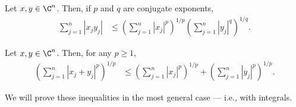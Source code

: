 \documentclass[10pt]{mypackage}
\begin{document}
\begin{theorem}
  Let $x,y\in \C^{n}$. Then, if $p$ and $q$ are conjugate exponents,
  \begin{align*}
    \sum_{j=1}^{n}\left\vert x_jy_j \right\vert &\leq \left( \sum_{j=1}^{n}\left\vert x_j \right\vert^{p} \right)^{1/p}\left( \sum_{j=1}^{n}\left\vert y_j \right\vert^{q} \right)^{1/q}.
  \end{align*}
\end{theorem}
\begin{theorem}
  Let $x,y\in \C^n$. Then, for any $p \geq 1$,
  \begin{align*}
    \left( \sum_{j=1}^{n}\left\vert x_j + y_j \right\vert^{p} \right)^{1/p} &\leq \left( \sum_{j=1}^{n}\left\vert x_j \right\vert^{p} \right)^{1/p} + \left( \sum_{j=1}^{n}\left\vert y_j \right\vert^{p} \right)^{1/p}.
  \end{align*}
\end{theorem}
We will prove these inequalities in the most general case --- i.e., with integrals.
\end{document}
